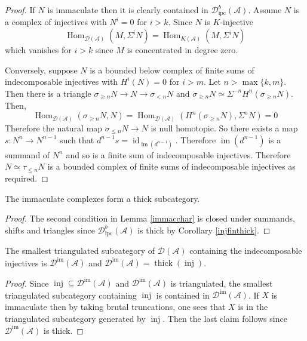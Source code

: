 \documentclass[12pt,oneside]{amsart}
\DeclareMathOperator{\im}{im}
\DeclareMathOperator{\Hom}{Hom}
\DeclareMathOperator{\thick}{thick}
\DeclareMathOperator{\id}{id}
\DeclareMathOperator{\inj}{inj}
\DeclareMathOperator{\immac}{im}
\DeclareMathOperator{\ipscoh}{ipc}
\begin{document}
\begin{proof}
If $N$ is immaculate then it is clearly contained in $\mathcal{D}^b_{\ipscoh}(\mathcal{A})$. Assume $N$ is a complex of injectives with $N^i = 0$ for $i > k$. Since $N$ is $K$-injective
\[
\Hom_{\mathcal{D}(\mathcal{A})}(M,\Sigma^i N) = \Hom_{K(\mathcal{A})}(M,\Sigma^i N)
\]
which vanishes for $i > k$ since $M$ is concentrated in degree zero.

Conversely, suppose $N$ is a bounded below complex of finite sums of indecomposable injectives with $H^i(N) = 0$ for $i > m$. Let $n > \max\{k,m\}$. Then there is a triangle $\sigma_{\geq n} N \to N \to \sigma_{< n} N$ and $\sigma_{\geq n} N \simeq \Sigma^{-n} H^n(\sigma_{\geq n} N)$. Then,
\[
\Hom_{\mathcal{D}(\mathcal{A})}(\sigma_{\geq n} N, N) = \Hom_{\mathcal{D}(\mathcal{A})}(H^n(\sigma_{\geq n} N),\Sigma^{n} N) = 0 
\]
Therefore the natural map $\sigma_{\leq n}N \to N$ is null homotopic. So there exists a map $s: N^n \to N^{n-1}$ such that $d^{n-1}s = \id_{\im(d^{n-1})}$. Therefore $\im(d^{n-1})$ is a summand of $N^n$ and so is a finite sum of indecomposable injectives. Therefore $N \simeq \tau_{\leq n} N$ is a bounded complex of finite sums of indecomposable injectives as required.
\end{proof}


\begin{cor}
The immaculate complexes form a thick subcategory. 
\end{cor}

\begin{proof}
The second condition in Lemma \ref{immacchar} is closed under summands, shifts and triangles since $\mathcal{D}^b_{\ipscoh}(\mathcal{A})$ is thick by Corollary \ref{injfinthick}.
\end{proof}

\begin{prop} \label{immacsarethick}
The smallest triangulated subcategory of $\mathcal{D}(\mathcal{A})$ containing the indecomposable injectives is $\mathcal{D}^{\immac}(\mathcal{A})$ and $\mathcal{D}^{\immac}(\mathcal{A}) = \thick(\inj)$. 
\end{prop}

\begin{proof}
Since $\inj \subseteq \mathcal{D}^{\immac}(\mathcal{A})$ and $\mathcal{D}^{\immac}(\mathcal{A})$ is triangulated, the smallest triangulated subcategory containing $\inj$ is contained in $\mathcal{D}^{\immac}(\mathcal{A})$. If $X$ is immaculate then by taking brutal truncations, one sees that $X$ is in the triangulated subcategory generated by $\inj$. Then the last claim follows since $\mathcal{D}^{\immac}(\mathcal{A})$ is thick.
\end{proof}









\end{document}
